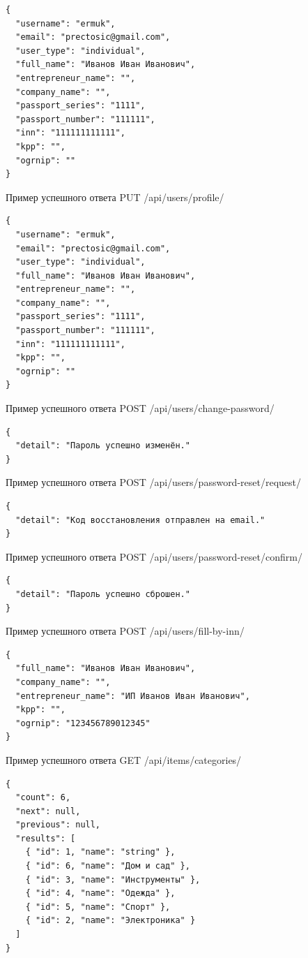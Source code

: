 \begin{verbatim}
{
  "username": "ermuk",
  "email": "prectosic@gmail.com",
  "user_type": "individual",
  "full_name": "Иванов Иван Иванович",
  "entrepreneur_name": "",
  "company_name": "",
  "passport_series": "1111",
  "passport_number": "111111",
  "inn": "111111111111",
  "kpp": "",
  "ogrnip": ""
}
\end{verbatim}

Пример успешного ответа PUT /api/users/profile/

\begin{verbatim}
{
  "username": "ermuk",
  "email": "prectosic@gmail.com",
  "user_type": "individual",
  "full_name": "Иванов Иван Иванович",
  "entrepreneur_name": "",
  "company_name": "",
  "passport_series": "1111",
  "passport_number": "111111",
  "inn": "111111111111",
  "kpp": "",
  "ogrnip": ""
}
\end{verbatim}

Пример успешного ответа POST /api/users/change-password/

\begin{verbatim}
{
  "detail": "Пароль успешно изменён."
}
\end{verbatim}

Пример успешного ответа POST /api/users/password-reset/request/

\begin{verbatim}
{
  "detail": "Код восстановления отправлен на email."
}
\end{verbatim}

Пример успешного ответа POST /api/users/password-reset/confirm/

\begin{verbatim}
{
  "detail": "Пароль успешно сброшен."
}
\end{verbatim}

Пример успешного ответа POST /api/users/fill-by-inn/

\begin{verbatim}
{
  "full_name": "Иванов Иван Иванович",
  "company_name": "",
  "entrepreneur_name": "ИП Иванов Иван Иванович",
  "kpp": "",
  "ogrnip": "123456789012345"
}
\end{verbatim}

Пример успешного ответа GET /api/items/categories/

\begin{verbatim}
{
  "count": 6,
  "next": null,
  "previous": null,
  "results": [
    { "id": 1, "name": "string" },
    { "id": 6, "name": "Дом и сад" },
    { "id": 3, "name": "Инструменты" },
    { "id": 4, "name": "Одежда" },
    { "id": 5, "name": "Спорт" },
    { "id": 2, "name": "Электроника" }
  ]
}
\end{verbatim}


